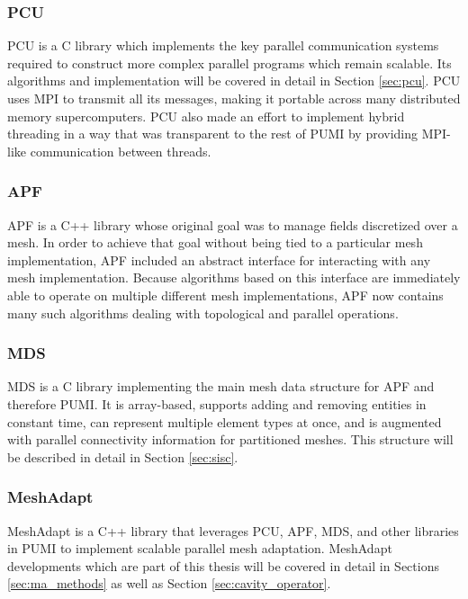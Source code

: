 \subsubsection{PCU}

PCU is a C library which implements the key parallel communication
systems required to construct more complex parallel programs
which remain scalable.
Its algorithms and implementation will be covered in detail
in Section \ref{sec:pcu}.
PCU uses MPI to transmit all its messages, making it portable
across many distributed memory supercomputers.
PCU also made an effort to implement hybrid threading in
a way that was transparent to the rest of PUMI by providing
MPI-like communication between threads.

\subsubsection{APF}

APF is a C++ library whose original goal was to manage fields discretized
over a mesh.
In order to achieve that goal without being tied to a particular mesh
implementation, APF included an abstract interface for interacting
with any mesh implementation.
Because algorithms based on this interface are immediately able to
operate on multiple different mesh implementations, APF now contains
many such algorithms dealing with topological and parallel operations.

\subsubsection{MDS}

MDS is a C library implementing the main mesh data structure for APF and
therefore PUMI.
It is array-based, supports adding and removing entities in constant time,
can represent multiple element types at once, and is augmented with
parallel connectivity information for partitioned meshes.
This structure will be described in detail in Section \ref{sec:sisc}.

\subsubsection{MeshAdapt}

MeshAdapt is a C++ library that leverages PCU, APF, MDS, and other
libraries in PUMI to implement scalable parallel mesh adaptation.
MeshAdapt developments which are part of this thesis will be covered
in detail in Sections \ref{sec:ma_methods} as well as Section
\ref{sec:cavity_operator}.

